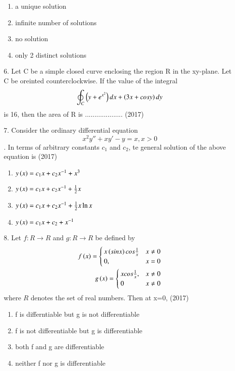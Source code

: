 \documentclass[journal]{IEEEtran}
\begin{document}
\begin{enumerate}
    \begin{enumerate}[label = (\Alph*)]
        \item a unique solution 
        \item infinite number of solutions
        \item no solution
        \item only 2 distinct solutions
    \end{enumerate}
    \item[6.] Let C be a simple closed curve enclosing the region R in the xy-plane. Let C be oreinted counterclockwise. If the value of the integral $$\oint_C \left(y+e^{x^2}\right)dx + \left(3x+cosy\right)dy$$ is 16, then the area of R is .................... \hfill (2017)
    \item[7.] Consider the ordinary differential equation $$x^2y''+xy'-y=x, x>0$$. In terms of arbitrary constants $c_1$ and $c_2$, te general solution of the above equation is \hfill (2017)
    \begin{enumerate}[label = (\Alph*)]
        \item $y\left(x\right) = c_1x+c_2x^{-1}+x^3$
        \item $y\left(x\right) = c_1x+c_2x^{-1}+\frac{1}{2}x$
        \item $y\left(x\right) = c_1x+c_2x^{-1}+\frac{1}{2}x\ln x$
        \item $y\left(x\right) = c_1x+c_2+x^{-1}$
    \end{enumerate}
    \item[8.] Let $f:R\rightarrow R$ and $g:R\rightarrow R$ be defined by \begin{align*}f\left(x\right)=\begin{cases}x\left(sinx\right)cos\frac{1}{x} & x\neq 0\\0,&x=0\end{cases}\\g\left(x\right)=\begin{cases}xcos\frac{1}{x},&x\neq 0\\0 &x\neq 0\end{cases}\end{align*} where $R$ denotes the set of real numbers. Then at x=0, \hfill (2017)
    \begin{enumerate}[label = (\Alph*)]
       \item f is differntiable but g is not differentiable
       \item f is not differentiable but g is differentiable
       \item both f and g are differentiable
       \item neither f nor g is differentiable

\end{enumerate}
\end{enumerate}
\end{document}
